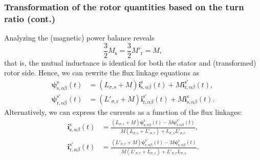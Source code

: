\begin{frame}
	\frametitle{Transformation of the rotor quantities based on the turn ratio (cont.)}
    \onslide<+->
    Analyzing the (magnetic) power balance reveals
    \begin{equation}
        \frac{3}{2}M_\mathrm{s} = \frac{3}{2}M'_\mathrm{r} = M, 
    \end{equation}
    that is, the mutual inductance is identical for both the stator and (transformed) rotor side. \onslide<+->Hence, we can rewrite the flux linkage equations as
    \begin{align}
        \bm{\psi}^\mathrm{s}_\mathrm{s,\alpha\beta}(t) &= (L_{\sigma,\mathrm{s}} +M) \bm{i}^\mathrm{s}_{\mathrm{s},\alpha\beta}(t) +  M\bm{i}^{\mathrm{s}'}_{\mathrm{r},\alpha\beta}(t),\\
        \bm{\psi}^{\mathrm{s}'}_\mathrm{r,\alpha\beta}(t) &= (L'_{\sigma,\mathrm{r}} + M) \bm{i}^{\mathrm{s}'}_{\mathrm{r},\alpha\beta}(t) +  M \bm{i}^\mathrm{s}_{\mathrm{s},\alpha\beta}(t).
    \end{align}
    \onslide<+->
    Alternatively, we can express the currents as a function of the flux linkages:
    \begin{align}
        \bm{i}^\mathrm{s}_{\mathrm{s},\alpha\beta}(t) &= \frac{(L_{\sigma,s}+M)\bm{\psi}^\mathrm{s}_\mathrm{s,\alpha\beta}(t)- M \bm{\psi}^\mathrm{s'}_\mathrm{r,\alpha\beta}(t)}{M(L_{\sigma,s}+L'_{\sigma,r}) + L_{\sigma,s}L'_{\sigma,r}},\\
        \bm{i}^{\mathrm{s}'}_{\mathrm{r},\alpha\beta}(t) &= \frac{(L'_{\sigma,r}+M)\bm{\psi}^{\mathrm{s}'}_\mathrm{r,\alpha\beta}(t)- M \bm{\psi}^{\mathrm{s}}_\mathrm{s,\alpha\beta}(t)}{M(L'_{\sigma,r}+L_{\sigma,s}) + L'_{\sigma,r}L_{\sigma,s}}.
    \end{align}
\end{frame}


